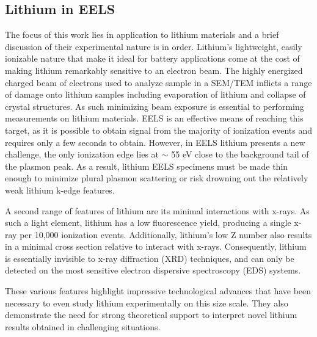 \subsection{Lithium in EELS}
The focus of this work lies in application to lithium materials and a brief discussion of their experimental nature is in order. Lithium's lightweight, easily ionizable nature that make it ideal for battery applications come at the cost of making lithium remarkably sensitive to an electron beam. The highly energized charged beam of electrons used to analyze sample in a SEM/TEM inflicts a range of damage onto lithium samples including evaporation of lithium and collapse of crystal structures.  As such minimizing beam exposure is essential to performing measurements on lithium materials.  EELS is an effective means of reaching this target, as it is possible to obtain signal from the majority of ionization events and requires only a few seconds to obtain.  However, in EELS lithium presents a new challenge, the only ionization edge lies at $\sim$ 55 eV close to the background tail of the plasmon peak.  As a result, lithium EELS specimens must be made thin enough to minimize plural plasmon scattering or risk drowning out the relatively weak lithium k-edge features.  

A second range of features of lithium are its minimal interactions with x-rays.  As such a light element, lithium has a low fluorescence yield, producing a single x-ray per 10,000 ionization events.  Additionally, lithium's low Z number also results in a minimal cross section relative to interact with x-rays.  Consequently, lithium is essentially invisible to x-ray diffraction (XRD) techniques, and can only be detected on the most sensitive electron dispersive spectroscopy (EDS) systems.

These various features highlight impressive technological advances that have been necessary to even study lithium experimentally on this size scale.  They also demonstrate the need for strong theoretical support to interpret novel lithium results obtained in challenging situations.  




